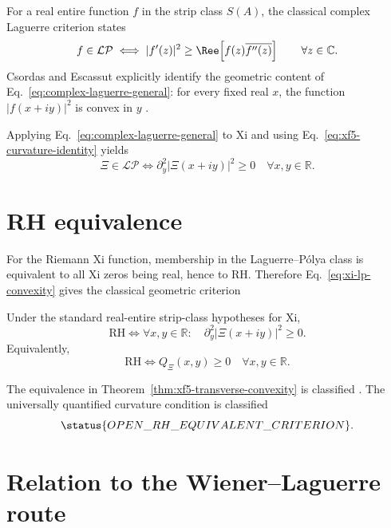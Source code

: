 For a real entire function $f$ in the strip class $S(A)$, the classical complex Laguerre criterion states
\begin{equation}\label{eq:complex-laguerre-general}
f\in\mathcal{LP}
\iff
|f'(z)|^2
\ge
\Ree\!\left[f(z)\overline{f''(z)}\right]
\qquad\forall z\in\mathbb C.
\end{equation}
Csordas and Escassut explicitly identify the geometric content of Eq.~\eqref{eq:complex-laguerre-general}: for every fixed real $x$, the function $|f(x+iy)|^2$ is convex in $y$ \cite{CsordasEscassut2005}.

Applying Eq.~\eqref{eq:complex-laguerre-general} to Xi and using Eq.~\eqref{eq:xf5-curvature-identity} yields
\begin{equation}\label{eq:xi-lp-convexity}
\boxed{
\Xi\in\mathcal{LP}
\iff
\partial_y^2|\Xi(x+iy)|^2\ge0
\quad\forall x,y\in\mathbb R.
}
\end{equation}

\section{RH equivalence}

For the Riemann Xi function, membership in the Laguerre--Pólya class is equivalent to all Xi zeros being real, hence to RH.  Therefore Eq.~\eqref{eq:xi-lp-convexity} gives the classical geometric criterion
\begin{theorem}\label{thm:xf5-transverse-convexity}
Under the standard real-entire strip-class hypotheses for Xi,
\begin{equation}\label{eq:xf5-rh-convexity}
\boxed{
\mathrm{RH}
\iff
\forall x,y\in\mathbb R:\quad
\partial_y^2|\Xi(x+iy)|^2\ge0.
}
\end{equation}
Equivalently,
\begin{equation}\label{eq:xf5-rh-q-nonnegative}
\boxed{
\mathrm{RH}
\iff
Q_\Xi(x,y)\ge0
\quad\forall x,y\in\mathbb R.
}
\end{equation}
\end{theorem}

The equivalence in Theorem~\ref{thm:xf5-transverse-convexity} is classified .  The universally quantified curvature condition is classified
\[
\status{OPEN\_RH\_EQUIVALENT\_CRITERION}.
\]

\section{Relation to the Wiener--Laguerre route}

